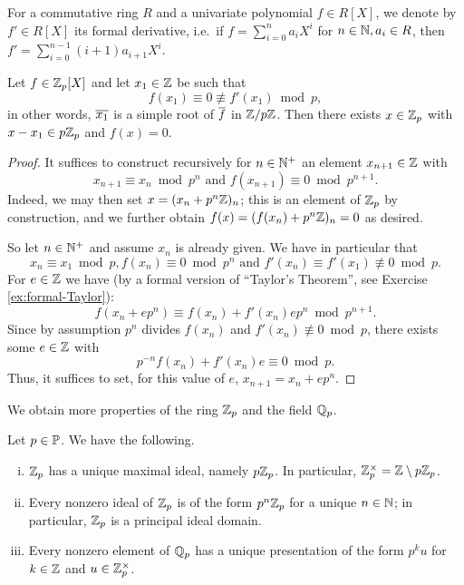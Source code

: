 \documentclass[12pt, leqno, british]{amsart}
\begin{document}
For a commutative ring $R$ and a univariate polynomial $f \in R[X]$, we denote by $f' \in R[X]$ its formal derivative, i.e.~if $f = \sum_{i=0}^n a_i X^i$ for $n \in \mathbb N, a_i \in R$, then $f' = \sum_{i=0}^{n-1} (i+1)a_{i+1}X^i$.
\begin{prop}\label{P:Hensel}
Let $f \in \mathbb Z_p[X]$ and let $x_1 \in \mathbb Z$ be such that
$$ f(x_1) \equiv 0 \not\equiv f'(x_1) \bmod p,$$
in other words, $\overline{x_1}$ is a simple root of $\overline{f}$ in $\mathbb Z/p\mathbb Z$.
Then there exists $x \in \mathbb Z_p$ with $x - x_1 \in p\mathbb Z_p$ and $f(x) = 0$.
\end{prop}
\begin{proof}
It suffices to construct recursively for $n \in \mathbb N^+$ an element $x_{n+1} \in \mathbb Z$ with
$$ x_{n+1} \equiv x_n \bmod p^n \text{ and } f(x_{n+1}) \equiv 0 \bmod p^{n+1}.$$
Indeed, we may then set $x = (x_n + p^n\mathbb Z)_n$; this is an element of $\mathbb Z_p$ by construction, and we further obtain $f(x) = (f(x_n) + p^n\mathbb Z)_n = 0$ as desired.

So let $n \in \mathbb N^+$ and assume $x_{n}$ is already given.
We have in particular that
$$ x_{n} \equiv x_1 \bmod p, f(x_n) \equiv 0 \bmod p^n \text{ and } f'(x_n) \equiv f'(x_1) \not\equiv 0 \bmod p. $$
For $e \in \mathbb Z$ we have (by a formal version of ``Taylor's Theorem'', see Exercise \eqref{ex:formal-Taylor}):
$$ f(x_n + ep^{n}) \equiv f(x_n) + f'(x_n) ep^{n} \bmod p^{n+1}.$$
Since by assumption $p^{n}$ divides $f(x_n)$ and $f'(x_n) \not\equiv 0 \bmod p$, there exists some $e \in \mathbb Z$ with
$$ p^{-n}f(x_n) + f'(x_n)e \equiv 0 \bmod p.$$
Thus, it suffices to set, for this value of $e$, $x_{n+1} = x_n + ep^n$.
\end{proof}
We obtain more properties of the ring $\mathbb Z_p$ and the field $\mathbb Q_p$.
\begin{prop}\label{P:Zp-properties}
Let $p \in \mathbb P$.
We have the following.
\begin{enumerate}[(i)]
\item\label{it:local} $\mathbb Z_p$ has a unique maximal ideal, namely $p\mathbb Z_p$.
In particular, $\mathbb Z_p^{\times} = \mathbb Z \setminus p\mathbb Z_p$.
\item\label{it:Zp-ideal-presentation} Every nonzero ideal of $\mathbb Z_p$ is of the form $p^n\mathbb Z_p$ for a unique $n \in \mathbb N$; in particular, $\mathbb Z_p$ is a principal ideal domain.
\item\label{it:Qp-presentation} Every nonzero element of $\mathbb Q_p$ has a unique presentation of the form $p^k u$ for $k \in \mathbb Z$ and $u \in \mathbb Z_p^\times$.
\end{enumerate}
\end{prop}
\end{document}
